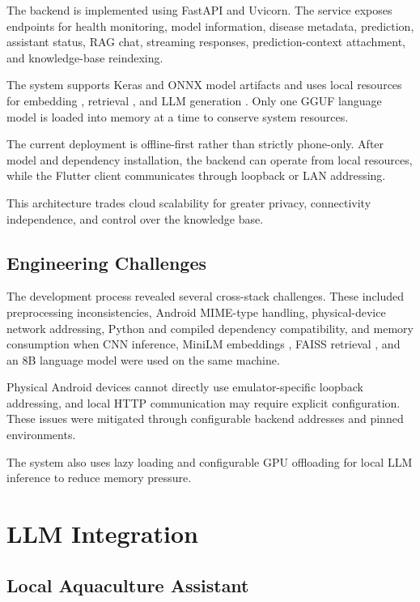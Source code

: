 \documentclass[conference]{IEEEtran}
\begin{document}
The backend is implemented using FastAPI \cite{b15} and Uvicorn. The service exposes endpoints for health monitoring, model information, disease metadata, prediction, assistant status, RAG chat, streaming responses, prediction-context attachment, and knowledge-base reindexing.

The system supports Keras and ONNX model artifacts and uses local resources for embedding \cite{b5}, retrieval \cite{b6}, and LLM generation \cite{b13}. Only one GGUF language model is loaded into memory at a time to conserve system resources.

The current deployment is offline-first rather than strictly phone-only. After model and dependency installation, the backend can operate from local resources, while the Flutter client communicates through loopback or LAN addressing.

This architecture trades cloud scalability for greater privacy, connectivity independence, and control over the knowledge base.

\subsection{Engineering Challenges}

The development process revealed several cross-stack challenges. These included preprocessing inconsistencies, Android MIME-type handling, physical-device network addressing, Python and compiled dependency compatibility, and memory consumption when CNN inference, MiniLM embeddings \cite{b5}, FAISS retrieval \cite{b6}, and an 8B language model \cite{b13} were used on the same machine.

Physical Android devices cannot directly use emulator-specific loopback addressing, and local HTTP communication may require explicit configuration. These issues were mitigated through configurable backend addresses and pinned environments.

The system also uses lazy loading and configurable GPU offloading for local LLM inference to reduce memory pressure.



\section{LLM Integration}

\subsection{Local Aquaculture Assistant}
\end{document}
